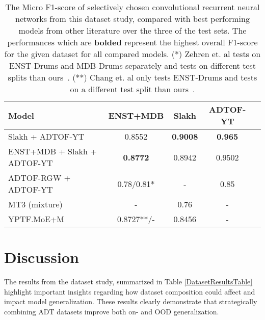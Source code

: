 \begin{table}[H]
    \centering
    \hspace*{-0.6cm}
    \begin{tabular}{l|cccc}
        Model & ENST+MDB & Slakh & ADTOF-YT      \\
        \hline
        Slakh + ADTOF-YT & 0.8552	& \textbf{0.9008}	& \textbf{0.965} \\
        ENST+MDB + Slakh + ADTOF-YT & \textbf{0.8772}	& 0.8942	& 0.9502 \\
        \hline
        ADTOF-RGW + ADTOF-YT~\cite{signals4040042} & 0.78/0.81* & - & 0.85 \\
        \hline
        MT3 (mixture)~\cite{gardner2022mt3multitaskmultitrackmusic} & - & 0.76 & - \\
        \hline
        YPTF.MoE+M~\cite{chang2024yourmt3+} & 0.8727**/- & 0.8456 & - \\
    \end{tabular}
    \caption{The Micro F1-score of selectively chosen convolutional recurrent neural networks from this dataset study, compared with best performing models from other literature over the three of the test sets. The performances which are \textbf{bolded} represent the highest overall F1-score for the given dataset for all compared models.
    (*) Zehren et. al tests on ENST-Drums and MDB-Drums separately and tests on different test splits than ours~\cite{signals4040042}.
    (**) Chang et. al only tests ENST-Drums and tests on a different test split than ours~\cite{chang2024yourmt3+}.}
    \label{DatasetComparisonTable}
\end{table}

\section{Discussion}

The results from the dataset study, summarized in Table \ref{DatasetResultsTable} highlight important insights regarding how dataset composition could affect and impact model generalization. These results clearly demonstrate that strategically combining \gls{ADT} datasets improve both on- and \acrfull{OOD} generalization.

